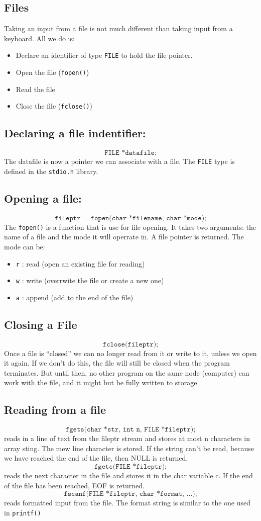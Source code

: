 \documentclass[a4paper, 10pt]{article}
\begin{document}
\subsection{Files}
Taking an input from a file is not much different than taking input from a keyboard. All we do is:
\begin{itemize}
    \item Declare an identifier of type \texttt{FILE} to hold the file pointer.
    \item Open the file (\texttt{fopen()})
    \item Read the file
    \item Close the file (\texttt{fclose()})
\end{itemize}
\subsection{Declaring a file indentifier:}
$$\texttt{FILE *datafile;}$$
The datafile is now a pointer we can associate with a file. The \texttt{FILE} type is defined in the \texttt{stdio.h} library.
\subsection{Opening a file:}
$$\texttt{fileptr = fopen(char *filename, char *mode);}$$
The \texttt{fopen()} is a function that is use for file opening. It takes two arguments: the name of a file and the mode it will operrate in. A file pointer is returned. The mode can be:
\begin{itemize}
    \item \texttt{r} : read (open an existing file for reading)
    \item \texttt{w} : write (overrwite the file or create a new one)
    \item \texttt{a} : append (add to the end of the file)
\end{itemize}
\subsection{Closing a File}
$$\texttt{fclose(fileptr);}$$
Once a file is “closed” we can no longer read from it or write to it, unless
we open it again. If we don’t do this, the file will still be closed when the
program terminates. But until then, no other program on the same node
(computer) can work with the file, and it might but be fully written to
storage
\subsection{Reading from a file}
$$\texttt{fgets(char *str, int n, FILE *fileptr);}$$
reads in a line of text from the fileptr stream and stores at most n
characters in array sting. The mew line character is stored.
If the string can’t be read, because we have reached the end of the file,
then NULL is returned.
$$\texttt{fgetc(FILE *fileptr);}$$
reads the next character in the file and stores it in the char variable c. If
the end of the file has been reached, EOF is returned.
$$\texttt{fscanf(FILE *fileptr, char *format, ...);}$$
reads formatted input from the file. The format string is similar to the
one used in \texttt{printf()}
\end{document}

